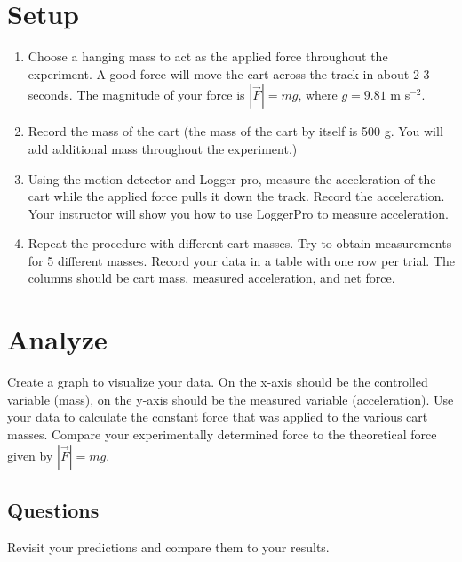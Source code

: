 \documentclass{article}
\begin{document}
\section*{Setup}
\begin{enumerate}
	\item Choose a hanging mass to act as the applied force throughout the experiment. A good force will move the cart across the track in about 2-3 seconds. The magnitude of your force is $|\vec{F}|=mg$, where $g=9.81$ m s$^{-2}$.
	\item Record the mass of the cart (the mass of the cart by itself is 500 g. You will add additional mass throughout the experiment.)
	\item Using the motion detector and Logger pro, measure the acceleration of the cart while the applied force pulls it down the track.  Record the acceleration. Your instructor will show you how to use LoggerPro to measure acceleration.
	\item Repeat the procedure with different cart masses. Try to obtain measurements for 5 different masses. Record your data in a table with one row per trial. The columns should be cart mass, measured acceleration, and net force.
\end{enumerate}

\section*{Analyze}
Create a graph to visualize your data. On the x-axis should be the controlled variable (mass), on the y-axis should be the measured variable (acceleration). Use your data to calculate the constant force that was applied to the various cart masses.  Compare your experimentally determined force to the theoretical force given by $|\vec{F}|=mg$.
\subsection*{Questions}
Revisit your predictions and compare them to your results.
\end{document}
